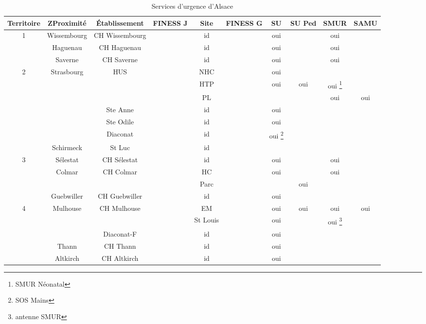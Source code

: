 \documentclass[12pt,english,french,twoside]{book}\usepackage[]{graphicx}\usepackage[]{color}
\providecommand{\tabularnewline}{\\} %
\begin{document}
\begin{landscape}
\begin{table}
\begin{center}
\begin{tabular}{|c|c|c|c|c|c|c|c|c|c|}
\hline 
Territoire & ZProximité & Établissement & FINESS J & Site & FINESS G & SU & SU Ped & SMUR & SAMU\tabularnewline
\hline 
\hline 
 \multirow{3}{*}{1} & Wissembourg & CH Wissembourg &  & id &  & oui &  & oui & \tabularnewline
\cline{2-10} 
 & Haguenau & CH Haguenau &  & id &  & oui &  & oui & \tabularnewline
\cline{2-10} 
 & Saverne & CH Saverne &  & id &  & oui &  & oui & \tabularnewline
\hline 
\multirow{7}{*}{2} & \multirow{6}{*}{Strasbourg} & \multirow{3}{*}{HUS} &  & NHC &  & oui &  &  & \tabularnewline
\cline{4-10} 
 &  &  &  & HTP &  & oui & oui & oui%
\footnote{SMUR Néonatal%
} & \tabularnewline
\cline{4-10} 
 &  &  &  & PL &  &  &  & oui & oui\tabularnewline
\cline{3-10} 
 &  & Ste Anne &  & id &  & oui &  &  & \tabularnewline
\cline{3-10} 
 &  & Ste Odile &  & id &  & oui &  &  & \tabularnewline
\cline{3-10} 
 &  & Diaconat &  & id &  & oui%
\footnote{SOS Mains%
} &  &  & \tabularnewline
\cline{2-10} 
 & Schirmeck & St Luc &  & id &  &  &  &  & \tabularnewline
\hline 
\multirow{4}{*}{3} & Sélestat & CH Sélestat &  & id &  & oui &  & oui & \tabularnewline
\cline{2-10} 
 & \multirow{2}{*}{Colmar} & \multirow{2}{*}{CH Colmar} &  & HC &  & oui &  & oui & \tabularnewline
\cline{4-10} 
 &  &  &  & Parc &  &  & oui &  & \tabularnewline
\cline{2-10} 
 & Guebwiller & CH Guebwiller &  & id &  & oui &  &  & \tabularnewline
\hline 
\multirow{5}{*}{4} & \multirow{3}{*}{Mulhouse} & \multirow{2}{*}{CH Mulhouse} &  & EM &  & oui & oui & oui & oui\tabularnewline
\cline{4-10} 
 &  &  &  & St Louis &  & oui &  & oui%
\footnote{antenne SMUR%
} & \tabularnewline
\cline{3-10} 
 &  & Diaconat-F &  & id &  & oui &  &  & \tabularnewline
\cline{2-10} 
 & Thann & CH Thann &  & id &  & oui &  &  & \tabularnewline
\cline{2-10} 
 & Altkirch & CH Altkirch &  & id &  & oui &  &  & \tabularnewline
\hline
\end{tabular}
 \caption[Structures d'urgence]{Services d'urgence d'Alsace}

\label{tab:sualsace}
\end{center}
\end{table}
\end{landscape}
\end{document}
